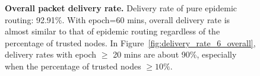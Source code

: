 \documentclass[11pt]{article}
\begin{document}
\begin{figure}[h!]
\center
{}
\hfill
{}

\caption{{\bf Overall packet delivery rate.} 
Delivery rate of pure epidemic routing: 92.91\%.  
With epoch=60 mins, overall delivery rate is almost similar to that of epidemic routing regardless of the percentage of trusted nodes. 
In Figure~\ref{fig:delivery_rate_6_overall}, delivery rates with epoch $\ge$ 20 mins are about 90\%, especially when the percentage of trusted nodes $\ge 10\%$.
}
\label{fig:delivery_rate}
\end{figure}
\end{document}
